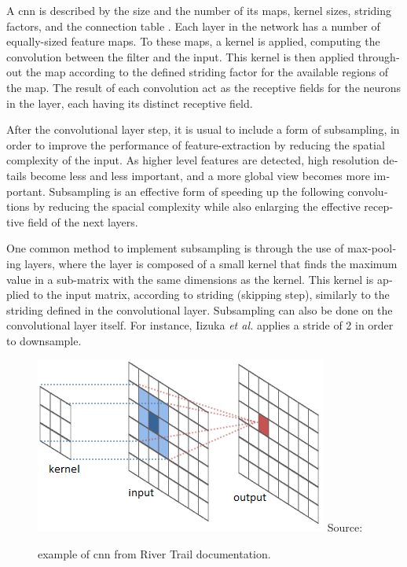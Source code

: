 \documentclass[12pt,openright,oneside,a4paper,english, brazilian]{abntex2}
\begin{document}
\begin{otherlanguage}{english}
A \acrshort{cnn} is described by the size and the number of its maps, kernel sizes, striding factors, and the connection table \cite{Ciresan2011}. Each layer in the network has a number of equally-sized feature maps. To these maps, a kernel is applied, computing the convolution between the filter and the input. This kernel is then applied throughout the map according to the defined striding factor for the available regions of the map. The result of each convolution act as the receptive fields for the neurons in the layer, each having its distinct receptive field.

After the convolutional layer step, it is usual to include a form of subsampling, in order to improve the performance of feature-extraction by reducing the spatial complexity of the input. As higher level features are detected, high resolution details become less and less important, and a more global view becomes more important. Subsampling is an effective form of speeding up the following convolutions by reducing the spacial complexity while also enlarging the effective receptive field of the next layers.

One common method to implement subsampling is through the use of max-pooling layers,
where the layer is composed of a small kernel that finds the maximum value in a sub-matrix with the same dimensions as the kernel. This kernel is applied to the input matrix, according to striding (skipping step), similarly to the striding defined in the convolutional layer. Subsampling can also be done on the convolutional layer itself. For instance, Iizuka \textit{et al.} \cite{Iizuka2016} applies a stride of 2 in order to downsample.

\begin{figure}[!htb]
\centering
\caption{example of \acrshort{cnn} from River Trail documentation.}
\includegraphics[width=\textwidth]{CNN}
Source: \cite{river_trail}
\label{cnn_fig}
\end{figure}


\end{otherlanguage}
\end{document}
